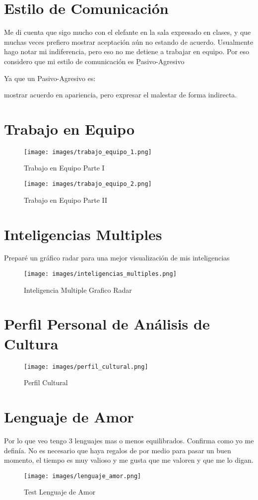 \section*{Estilo de Comunicación}
Me di cuenta que sigo mucho con el elefante en la sala expresado en clases, y que muchas veces prefiero mostrar aceptación aún no estando de acuerdo.
Usualmente hago notar mi indiferencia, pero eso no me detiene a trabajar en equipo. Por eso considero que mi estilo de comunicación es \b{Pasivo-Agresivo}

Ya que un Pasivo-Agresivo es:

mostrar acuerdo en apariencia, pero expresar el malestar de forma indirecta.


\section*{Trabajo en Equipo}

\begin{figure}[H]
  \centering
  \texttt{[image: images/trabajo\_equipo\_1.png]}
  \caption{Trabajo en Equipo Parte I}
  \label{fig:trabajo_equipo_1}
\end{figure}

\begin{figure}[H]
  \centering
  \texttt{[image: images/trabajo\_equipo\_2.png]}
  \caption{Trabajo en Equipo Parte II}
  \label{fig:trabajo_equipo_1}
\end{figure}

\section*{Inteligencias Multiples}
Preparé un gráfico radar para una mejor visualización de mis inteligencias
\begin{figure}[H]
  \centering
  \texttt{[image: images/inteligencias\_multiples.png]}
  \caption{Inteligencia Multiple Grafico Radar}
  \label{fig:im}
\end{figure}

\section*{Perfil Personal de Análisis de Cultura}
\begin{figure}[H]
  \centering
  \texttt{[image: images/perfil\_cultural.png]}
  \caption{Perfil Cultural}
  \label{fig:pc}
\end{figure}

\section*{Lenguaje de Amor}
Por lo que veo tengo 3 lenguajes mas o menos equilibrados. Confirma como yo me definía.
No es necesario que haya regalos de por medio para pasar un buen momento, el tiempo es muy valioso
y me gusta que me valoren y que me lo digan.
\begin{figure}[H]
  \centering
  \texttt{[image: images/lenguaje\_amor.png]}
  \caption{Test Lenguaje de Amor}
  \label{fig:lenguaje_amor}
\end{figure}
